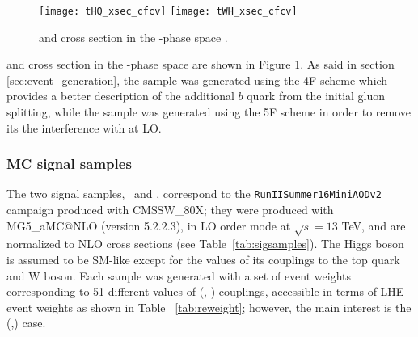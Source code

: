 \begin{figure}[htp]
\centering
\texttt{[image: tHQ\_xsec\_cfcv]}
\texttt{[image: tWH\_xsec\_cfcv]} 
\caption[\tHq and \tHW cross section in the \Ct-\CV phase space]{\tHq and \tHW cross section in the \Ct-\CV phase space \cite{THQProdTwiki}.}
\label{fig:ktkv_phase_space}
\end{figure}

\tHq and \tHW cross section in the \Ct-\CV phase space are shown in Figure \ref{fig:ktkv_phase_space}. As said in section \ref{sec:event_generation}, the \tHq sample was generated using the 4F scheme which provides a better description of the additional $b$ quark from the initial gluon splitting, while the \tHW sample was generated using the 5F scheme in order to remove its the interference with \ttH at LO.


\subsubsection*{MC signal samples}

The two signal samples, \tHq\ and \tHW, correspond to the \verb|RunIISummer16MiniAODv2| campaign produced with CMSSW\_80X; they were produced with \textsc{MG5\_}a\textsc{MC@NLO} (version 5.2.2.3), in LO order mode at $\sqrt{s}=13$ TeV, and are normalized to NLO cross sections (see Table~\ref{tab:sigsamples}). The Higgs boson is assumed to be SM-like except for the values of its couplings to the top quark and W boson. Each sample was generated with a set of event weights corresponding to 51 different values of (\Ct, \CV) couplings, accessible in terms of LHE event weights as shown in Table ~\ref{tab:reweight}; however, the main interest is the (,) case. 

